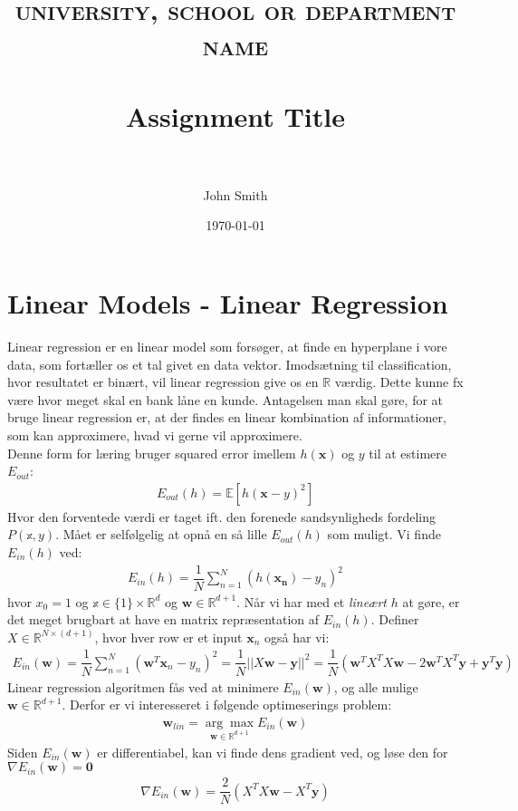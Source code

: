 \documentclass[paper=a4, fontsize=11pt]{scrartcl} %
\title{	
	\normalfont \normalsize 
	\textsc{university, school or department name} \\ [25pt] %
	\horrule{0.5pt} \\[0.4cm] %
	\huge Assignment Title \\ %
	\horrule{2pt} \\[0.5cm] %
}
\author{John Smith} %
\date{\normalsize\today} %
\numberwithin{equation}{section} %
\numberwithin{figure}{section} %
\numberwithin{table}{section} %
\begin{document}
	
	\section*{Linear Models - Linear Regression}
	
	Linear regression er en linear model som forsøger, at finde en hyperplane i vore data, som fortæller os et tal givet en data vektor. Imodsætning til classification, hvor resultatet er binært, vil linear regression give os en $\mathbb{R}$ værdig. Dette kunne fx være hvor meget skal en bank låne en kunde. Antagelsen man skal gøre, for at bruge linear regression er, at der findes en linear kombination af informationer, som kan approximere, hvad vi gerne vil approximere. \\
	
	Denne form for læring bruger squared error imellem $h(\mathbf{x})$ og $y$ til at estimere $E_{out}$:
	\begin{align*}
	E_{out}(h)=\mathbb{E}\left[h(\mathbf{x}-y)^2\right]
	\end{align*}
	Hvor  den forventede værdi er taget ift. den forenede sandsynligheds fordeling $P(\mathbb{x},y)$. Mået er selfølgelig at opnå en så lille $E_{out}(h)$ som muligt. Vi finde $E_{in}(h)$ ved:
	\begin{align*}
	E_{in}(h)=\dfrac{1}{N}\sum_{n=1}^{N}(h(\mathbf{x_n})-y_n)^2
	\end{align*}
	hvor $x_0=1$ og $\mathbb{x}\in\{1\}\times\mathbb{R}^d$ og $\mathbf{w}\in\mathbb{R}^{d+1}$. Når vi har med et \textit{lineært} $h$ at gøre, er det meget brugbart at have en matrix repræsentation af $E_{in}(h)$. Definer $X\in\mathbb{R}^{N\times(d+1)}$, hvor hver row er et input $\mathbf{x}_n$ også har vi:
	\begin{align*}
	E_{in}(\mathbf{w})=\dfrac{1}{N}\sum_{n=1}^{N}(\mathbf{w}^T\mathbf{x}_n-y_n)^2=\dfrac{1}{N}||X\mathbf{w}-\mathbf{y}||^2=\dfrac{1}{N}(\mathbf{w}^TX^TX\mathbf{w}-2\mathbf{w}^TX^T\mathbf{y}+\mathbf{y}^T\mathbf{y})
	\end{align*}
	Linear regression algoritmen fås ved at minimere $E_{in}(\mathbf{w})$, og alle mulige $\mathbf{w}\in\mathbb{R}^{d+1}$. Derfor er vi interesseret i følgende optimeserings problem:
	\begin{align*}
		\mathbf{w}_{lin}=\underset{\mathbf{w}\in\mathbb{R}^{d+1}}{\arg\max}E_{in}(\mathbf{w})
	\end{align*}
	Siden $E_{in}(\mathbf{w})$ er differentiabel, kan vi finde dens gradient ved, og løse den for $\nabla E_{in}(\mathbf{w})=\mathbf{0}$
	\begin{align*}
	\nabla E_{in}(\mathbf{w})=\dfrac{2}{N}(X^TX\mathbf{w}-X^T\mathbf{y})
	\end{align*}
\end{document}
